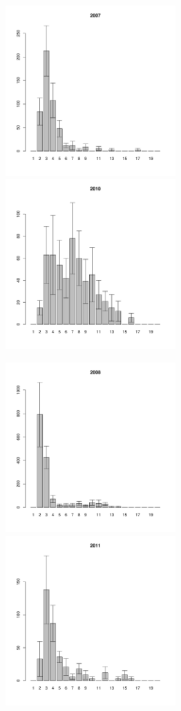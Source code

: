 \documentclass[12pt, a4paper]{article}
\begin{document}

\begin{figure}[h]

\begin{multicols}{2}
\hfill
\includegraphics[width=65mm]{../White_Sea/Lomnishniy/Lomnishniy_2007_.pdf}
\hfill
\includegraphics[width=65mm]{../White_Sea/Lomnishniy/Lomnishniy_2010_.pdf}
\end{multicols}



\begin{multicols}{2}
\hfill
\includegraphics[width=65mm]{../White_Sea/Lomnishniy/Lomnishniy_2008_.pdf}
\hfill
\includegraphics[width=65mm]{../White_Sea/Lomnishniy/Lomnishniy_2011_.pdf}
\end{multicols}


\end{figure}
\end{document}

